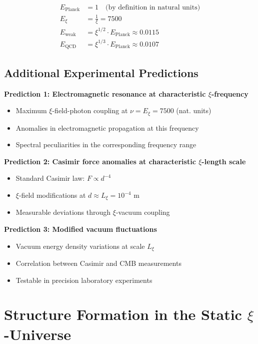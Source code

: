 	\begin{align}
		E_{\text{Planck}} &= 1 \quad \text{(by definition in natural units)} \\
		E_\xi &= \frac{1}{\xi} = 7500 \\
		E_{\text{weak}} &= \xi^{1/2} \cdot E_{\text{Planck}} \approx 0.0115 \\
		E_{\text{QCD}} &= \xi^{1/3} \cdot E_{\text{Planck}} \approx 0.0107
	\end{align}
	
	\subsection{Additional Experimental Predictions}
	
	\textbf{Prediction 1: Electromagnetic resonance at characteristic $\xi$-frequency}
	\begin{itemize}
		\item Maximum $\xi$-field-photon coupling at $\nu = E_\xi = 7500$ (nat. units)
		\item Anomalies in electromagnetic propagation at this frequency
		\item Spectral peculiarities in the corresponding frequency range
	\end{itemize}
	
	\textbf{Prediction 2: Casimir force anomalies at characteristic $\xi$-length scale}
	\begin{itemize}
		\item Standard Casimir law: $F \propto d^{-4}$
		\item $\xi$-field modifications at $d \approx L_\xi = 10^{-4}$ m
		\item Measurable deviations through $\xi$-vacuum coupling
	\end{itemize}
	
	\textbf{Prediction 3: Modified vacuum fluctuations}
	\begin{itemize}
		\item Vacuum energy density variations at scale $L_\xi$
		\item Correlation between Casimir and CMB measurements
		\item Testable in precision laboratory experiments
	\end{itemize}
	
	\section{Structure Formation in the Static $\xi$-Universe}
	
